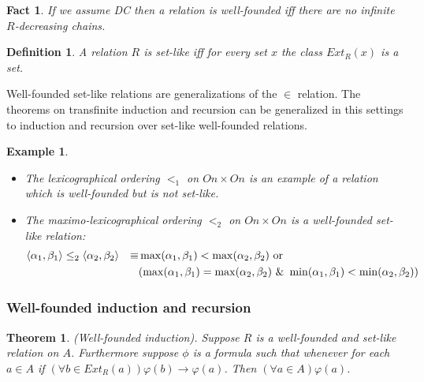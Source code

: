 \documentclass[a4paper,11pt,oneside]{mybook}
\theoremstyle{theorem}
\newtheorem{theorem}[subsection]{Theorem}
\newtheorem{fact}[subsection]{Fact}
\newtheorem{definition}[subsection]{Definition}
\theoremstyle{example}
\newtheorem{example}[subsection]{Example}
\begin{document}
{\begin{fact} If we assume DC then a relation is well-founded iff there are no infinite $R$-decreasing chains.
\end{fact}


\begin{definition} A relation $R$ is \emph{set-like} iff for every set $x$ the class $Ext_R(x)$ is a set.
\end{definition}

Well-founded set-like relations are generalizations of the $\in$ relation. The theorems on transfinite induction and recursion can be
generalized in this settings to induction and recursion over set-like well-founded relations.

\begin{example}
\begin{itemize}
 \item[(i)]  The lexicographical ordering $<_1$ on $On\times On$ is an example of a relation which is well-founded but is not set-like.
 \item[(ii)] The maximo-lexicographical ordering $<_2$ on $On\times On$ is a well-founded set-like relation:
\begin{align}
{} & \langle \alpha_1,\beta_1\rangle \leq_2 \langle \alpha_2,\beta_2\rangle & \equiv& \max(\alpha_1,\beta_1) < \max(\alpha_2,\beta_2)\ \hbox{or}\ \\
                                                                          &&&(\max(\alpha_1,\beta_1) = \max(\alpha_2,\beta_2)\ \&\ %
                                                                          \min(\alpha_1,\beta_1)< \min(\alpha_2,\beta_2) )
\end{align}

\end{itemize}
\end{example}

\subsubsection{Well-founded induction and recursion}


\begin{theorem}\label{WF-induction}
{\rm (Well-founded induction).}
Suppose $R$ is a well-founded and set-like relation on $A$.
Furthermore suppose $\phi$ is a formula such that whenever for each $a\in A$ if
$(\forall b\in Ext_R(a))\varphi(b) \rightarrow \varphi(a)$. Then $(\forall a\in A)\varphi(a)$.
\end{theorem}

}
\end{document}
